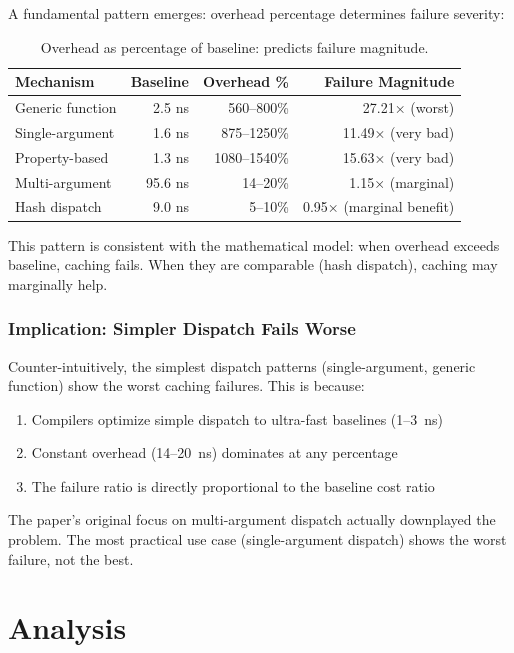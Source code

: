 \documentclass[sigplan,final]{acmart}
\begin{document}
A fundamental pattern emerges: overhead percentage determines failure severity:

\begin{table}[h]
\centering
\caption{Overhead as percentage of baseline: predicts failure magnitude.}
\label{tab:overhead-percent}
\begin{tabular}{@{}lrrr@{}}
\toprule
\textbf{Mechanism} & \textbf{Baseline} & \textbf{Overhead \%} & \textbf{Failure Magnitude} \\
\midrule
Generic function & 2.5 ns & 560--800\% & 27.21× (worst) \\
Single-argument & 1.6 ns & 875--1250\% & 11.49× (very bad) \\
Property-based & 1.3 ns & 1080--1540\% & 15.63× (very bad) \\
Multi-argument & 95.6 ns & 14--20\% & 1.15× (marginal) \\
Hash dispatch & 9.0 ns & 5--10\% & 0.95× (marginal benefit) \\
\bottomrule
\end{tabular}
\end{table}

This pattern is consistent with the mathematical model: when overhead exceeds baseline, caching
fails. When they are comparable (hash dispatch), caching may marginally help.

\subsubsection{Implication: Simpler Dispatch Fails Worse}

Counter-intuitively, the simplest dispatch patterns (single-argument, generic function) show the
worst caching failures. This is because:

\begin{enumerate}
  \item Compilers optimize simple dispatch to ultra-fast baselines (1--3~ns)
  \item Constant overhead (14--20~ns) dominates at any percentage
  \item The failure ratio is directly proportional to the baseline cost ratio
\end{enumerate}

The paper's original focus on multi-argument dispatch actually downplayed the problem. The most
practical use case (single-argument dispatch) shows the worst failure, not the best.

\section{Analysis}
\end{document}

